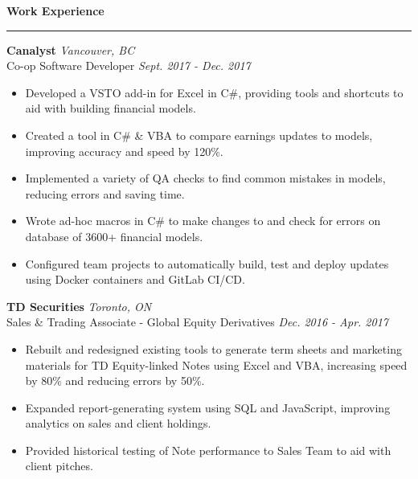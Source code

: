 \documentclass{letter}
\begin{document}
	\begin{flushleft}
		{\Large \textbf{Work Experience}}
		\rule[5pt]{\textwidth}{0.4pt}
		\vspace{-15pt}
		{\large\textbf{Canalyst}}  \hfill \textit{Vancouver, BC} \\
		\vspace{15pt}
		Co-op Software Developer \hfill \textit{Sept. 2017 - Dec. 2017}
		\vspace{-9pt}
		\begin{itemize}
			\item Developed a VSTO add-in for Excel in C\#, providing tools and shortcuts to aid with building financial models.\vspace{-3pt}
			\item Created a tool in C\# \& VBA to compare earnings updates to models, improving accuracy and speed by 120\%.\vspace{-3pt}
			\item Implemented a variety of QA checks to find common mistakes in models, reducing errors and saving time. \vspace{-3pt}
			\item Wrote ad-hoc macros in C\# to make changes to and check for errors on database of 3600+ financial models. \vspace{-3pt}
			\item Configured team projects to automatically build, test and deploy updates using Docker containers and GitLab CI/CD.
		\end{itemize}

		{\large\textbf{TD Securities}}  \hfill \textit{Toronto, ON} \\
		\vspace{1pt}
		Sales \& Trading Associate - Global Equity Derivatives \hfill \textit{Dec. 2016 - Apr. 2017}
		\vspace{-9pt}
		\begin{itemize}
			\item Rebuilt and redesigned existing tools to generate term sheets and marketing materials for TD Equity-linked Notes using Excel and VBA, increasing speed by 80\% and reducing errors by 50\%. \vspace{-3pt}
			\item Expanded report-generating system using SQL and JavaScript, improving analytics on sales and client holdings. \vspace{-3pt}
			\item Provided historical testing of Note performance to Sales Team to aid with client pitches.
		\end{itemize}
	

\end{flushleft}
\end{document}
